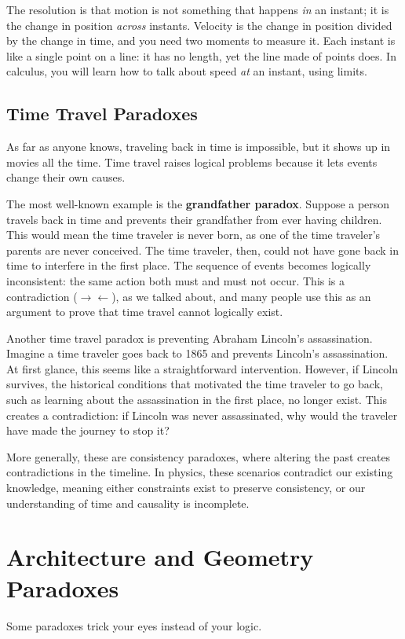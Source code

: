 The resolution is that motion is not something that happens \emph{in} an
instant; it is the change in position \emph{across} instants. Velocity is
the change in position divided by the change in time, and you need two
moments to measure it. Each instant is like a single point on a line: it
has no length, yet the line made of points does. In calculus, you will
learn how to talk about speed \emph{at} an instant, using limits.

\subsection{Time Travel Paradoxes}
As far as anyone knows, traveling back in time is impossible, but it shows
up in movies all the time. Time travel raises logical problems because it
lets events change their own causes.

The most well-known example is the \textbf{grandfather paradox}. Suppose a person travels back in time and prevents their grandfather
from ever having children. This would mean the time traveler is never born, as one of the time traveler's parents are never conceived. The time traveler, then, could not have gone back in time to interfere in the first place. The sequence of events becomes logically inconsistent: the same action both must and must not occur. This is a contradiction ($\rightarrow \leftarrow$), as we talked about, and many people use this as an argument to prove that time travel cannot logically exist.

Another time travel paradox is preventing Abraham Lincoln's assassination. Imagine a time traveler goes back to 1865 and prevents Lincoln's assassination. At first glance, this seems like a straightforward intervention. However, if Lincoln survives, the historical conditions that motivated the time traveler to go back, such as learning about the assassination in the first place, no longer exist. This creates a contradiction: if Lincoln was never assassinated, why would the traveler have made the journey to stop it?


More generally, these are consistency paradoxes, where altering the past creates contradictions in the timeline. In physics, these scenarios contradict our existing knowledge, meaning either constraints exist to preserve consistency, or our understanding of time and causality is incomplete.
\section{Architecture and Geometry Paradoxes}
Some paradoxes trick your eyes instead of your logic.
